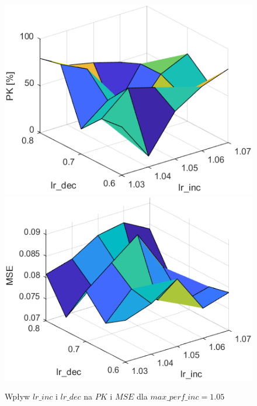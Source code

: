 \begin{figure}[!htb]
  \includegraphics[width = \linewidth]{Grafika/exp5/pk105.png}
\endminipage\hfill
{}
  \includegraphics[width = \linewidth]{Grafika/exp5/mse105.png}
\endminipage\hfill
\caption{Wpływ $lr\_inc$ i $lr\_dec$ na $PK$ i $MSE$ dla $max\_perf\_inc=1.05$}
\end{figure}
